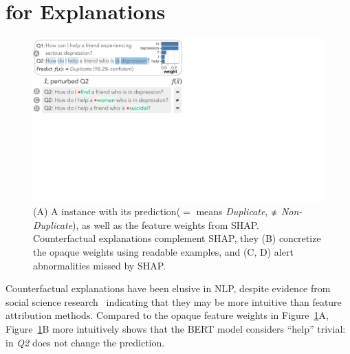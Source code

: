 
\newcommand{\fwone}[1]{\colbox{cfwone}{#1}\xspace}
\newcommand{\fwtwo}[1]{\colbox{cfwtwo}{#1}\xspace}
\newcommand{\fwthree}[1]{\colbox{cfwthree}{#1}\xspace}
\newcommand{\fwfour}[1]{\colbox{cfwfour}{#1}\xspace}

\newcommand{\fexp}[2]{\texttt{[{\color{darkgray}{#1:#2}}]}\xspace}
\newcommand{\fexptag}[1]{\fexp{TAG}{#1}}
\newcommand{\fexpfrom}[1]{\fexp{FROM}{#1}}
\newcommand{\fexpto}[1]{\fexp{TO}{#1}}
\newcommand{\fexptemp}[1]{\fexp{TEMP}{#1}}


\section{\sysname for Explanations}
\label{sec:app_explain}




\begin{figure}[t]
\centering
\includegraphics[trim={0 21cm 33cm 0cm},clip,width=1\columnwidth]{figures/explanation_v2.pdf}
\vspace{-15pt}
\caption{
(A) A \qqp instance with its prediction\footnotemark ($\mathbf{=}$ means \emph{Duplicate}, $\mathbf{\not\eq}$ \emph{Non-Duplicate}), as well as the feature weights from SHAP.
Counterfactual explanations complement SHAP, \ie they (B) concretize the opaque weights using readable examples, and (C, D) alert abnormalities missed by SHAP.
}
\vspace{-10pt}
\label{fig:explanation}
\end{figure}

Counterfactual explanations have been elusive in NLP, despite evidence from social science research~\cite{miller} indicating that they may be more intuitive than feature attribution methods. 
Compared to the opaque feature weights in Figure~\ref{fig:explanation}A, Figure~\ref{fig:explanation}B more intuitively shows that the BERT \qqp model considers ``help'' trivial: 
 in \emph{Q2} does not change the prediction.

